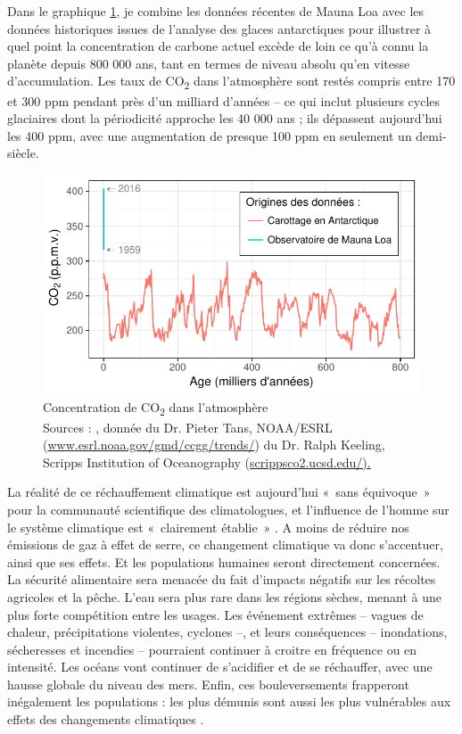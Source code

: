 Dans le graphique \ref{fig:CO2Emissions}, je combine les données récentes de Mauna Loa avec les données historiques issues de l'analyse des glaces antarctiques pour illustrer à quel point la concentration de carbone actuel excède de loin ce qu'à connu la planète depuis 800 000 ans, tant en termes de niveau absolu qu'en vitesse d'accumulation. Les taux de CO\textsubscript{2} dans l'atmosphère sont restés compris entre 170 et 300 ppm pendant près d'un milliard d'années -- ce qui inclut plusieurs cycles glaciaires dont la périodicité approche les 40 000 ans ; ils dépassent aujourd'hui les 400 ppm, avec une augmentation de presque 100 ppm en seulement un demi-siècle.

\begin{figure}[!ht]
	\centering
	\includegraphics{figures/CO2Emissions.pdf}
	\caption[Concentration de CO\textsubscript{2} dans l'atmosphère]{Concentration de CO\textsubscript{2} dans l'atmosphère \\ Sources : \citet{Luthi2008}, donnée du Dr. Pieter Tans, NOAA/ESRL (\url{www.esrl.noaa.gov/gmd/ccgg/trends/}) du Dr. Ralph Keeling, Scripps Institution of Oceanography (\url{scrippsco2.ucsd.edu/).}}
	\label{fig:CO2Emissions}
\end{figure}

La réalité de ce réchauffement climatique est aujourd’hui «~sans équivoque~» pour la communauté scientifique des climatologues, et l'influence de l'homme sur le système climatique est «~clairement établie~» \citep{IPCC2014}.
A moins de réduire nos émissions de gaz à effet de serre, ce changement climatique va donc s’accentuer, ainsi que ses effets. Et les populations humaines seront directement concernées. La sécurité alimentaire sera menacée du fait d’impacts négatifs sur les récoltes agricoles et la pêche. L’eau sera plus rare dans les régions sèches, menant à une plus forte compétition entre les usages. Les événement extrêmes -- vagues de chaleur, précipitations violentes, cyclones --, et leurs conséquences -- inondations, sécheresses et incendies -- pourraient continuer à croitre en fréquence ou en intensité. Les océans vont continuer de s’acidifier et de se réchauffer, avec une hausse globale du niveau des mers. 
Enfin, ces bouleversements frapperont inégalement les populations : les plus démunis sont aussi les plus vulnérables aux effets des changements climatiques \citep{IPCC2014}.


